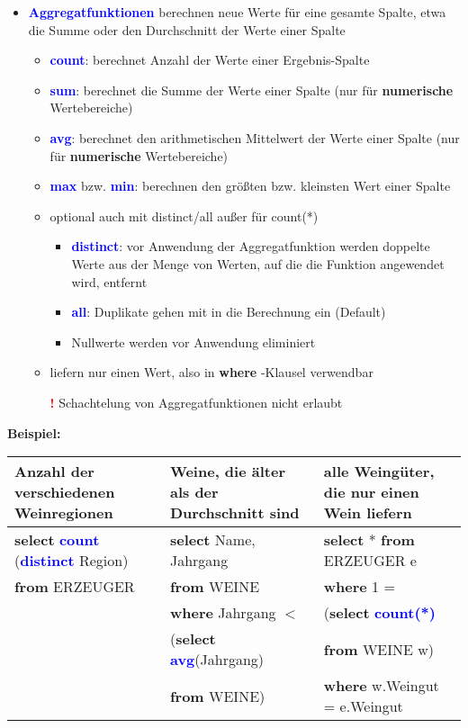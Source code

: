 \documentclass{scrartcl}
\newcommand{\key}[1]{{\textcolor{blue}{\textbf{#1}}}}
\newcommand{\select}{\textbf{select }}
\newcommand{\from}{\textbf{from }}
\newcommand{\where}{\textbf{where }}
\begin{document}
\begin{itemize}
	\itemsep0em
	\item \key{Aggregatfunktionen} berechnen neue Werte für eine gesamte Spalte, etwa die Summe oder den Durchschnitt der Werte einer Spalte
	\begin{itemize}
		\item \key{count}: berechnet Anzahl der Werte einer Ergebnis-Spalte
		\item \key{sum}: berechnet die Summe der Werte einer Spalte (nur für \textbf{numerische} Wertebereiche)
		\item \key{avg}: berechnet den arithmetischen Mittelwert der Werte einer Spalte (nur für \textbf{numerische} Wertebereiche)
		\item \key{max} bzw. \key{min}: berechnen den größten bzw. kleinsten Wert einer Spalte
		\item optional auch mit distinct/all außer für count(*)
		\begin{itemize}
			\item \key{distinct}: vor Anwendung der Aggregatfunktion werden doppelte Werte aus der Menge von Werten, auf die die Funktion angewendet wird, entfernt
			\item \key{all}: Duplikate gehen mit in die Berechnung ein (Default)
			\item Nullwerte werden vor Anwendung eliminiert 
		\end{itemize}
	\item liefern nur einen Wert, also in \where-Klausel verwendbar
	\item[\textbf{\textcolor{red}{!}}] Schachtelung von Aggregatfunktionen nicht erlaubt
	\end{itemize}
\end{itemize}

\textbf{Beispiel:} \\
\begin{tabular}{|p{}p{} p{ }|}
	\hline
	Anzahl der verschiedenen Weinregionen & Weine, die älter als der Durchschnitt sind & alle Weingüter, die nur einen Wein liefern \\
	\hline
	\select \key{count} (\key{distinct} Region) & \select Name, Jahrgang & \select * \from ERZEUGER e \\
	\from ERZEUGER & \from WEINE & \where 1 =  \\
	& \where Jahrgang $<$  & (\select \key{count(*)}  \\
	& (\select \key{avg}(Jahrgang)  & \from WEINE w)\\
	& \from WEINE) & \where w.Weingut = e.Weingut \\
	\hline
\end{tabular}
\end{document}
